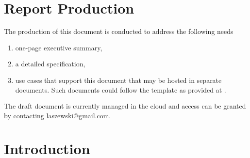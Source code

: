 \section*{Report Production}


The production of this document is conducted to address the following
needs

\begin{enumerate}
  \item one-page executive summary,

  \item a detailed specification,

  \item use cases that support this document that may be hosted in
    separate documents. Such documents could follow the template as
    provided at \cite{nist-bigdatawg}.

\end{enumerate}


\parindent0pt The draft document is currently managed in the cloud and access can be
granted by contacting \url{laszewski@gmail.com}.


\section{Introduction}



